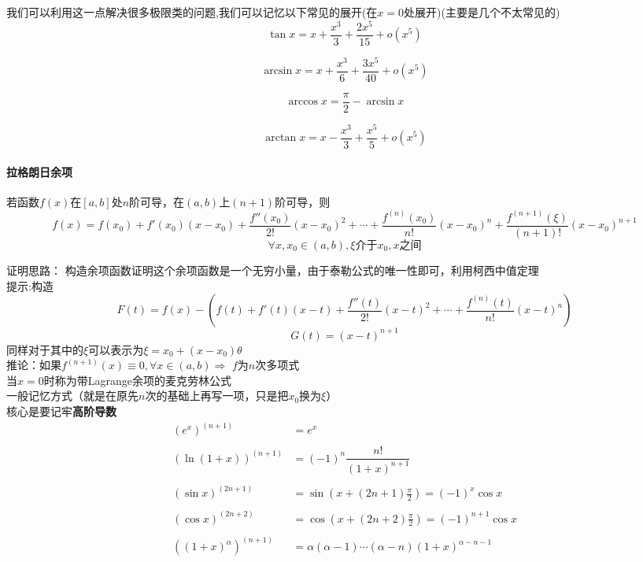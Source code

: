 \documentclass[11pt,hyperref,a4paper,UTF8]{ctexart}
\newcommand{\parameter}[1]{\left(#1\right)}
\begin{document}
\begin{CJK}{UTF8}{gkai}
我们可以利用这一点解决很多极限类的问题,我们可以记忆以下常见的展开(在$x = 0$处展开)(主要是几个不太常见的)
\[\tan  x = x + \dfrac{x^3}{3} + \dfrac{2x^5}{15} + o(x^5) \]

\[\arcsin x = x + \dfrac{x^3}{6} + \dfrac{3x^5}{40} + o(x^5)\]

\[\arccos x = \dfrac{\pi}{2} - \arcsin x\]

\[\arctan x = x - \dfrac{x^3}{3} + \dfrac{x^5}{5} + o(x^5)\]

\paragraph{拉格朗日余项}
若函数$f(x)$在$[a,b]$处$n$阶可导，在$(a,b)$上$(n+1)$阶可导，则
\[f(x) = f(x_0) + f'(x_0) (x-x_0) + \dfrac{f''(x_0)}{2 !} (x-x_0)^2 + \cdots + \dfrac{f^{(n)}(x_0)}{n !} (x-x_0)^n + \dfrac{f^{(n+1)}(\xi)}{(n+1) !} (x-x_0)^{n+1}\]
\[\forall x,x_0\in (a,b),\xi\text{介于}x_0,x\text{之间}\]

证明思路： 构造余项函数证明这个余项函数是一个无穷小量，由于泰勒公式的唯一性即可，利用柯西中值定理\\

提示:构造\[F(t) = f(x) - (f(t) + f'(t) (x-t) + \dfrac{f''(t)}{2 !} (x-t)^2 + \cdots + \dfrac{f^{(n)}(t)}{n !} (x-t)^n )\]\[G(t) = (x-t) ^ {n+1}\]
同样对于其中的$\xi$可以表示为$\xi = x_0 + (x- x_0) \theta$\\

推论：如果$f^{(n+1)}(x)\equiv 0,\forall x\in (a,b)\Rightarrow$ $f$为$n$次多项式\\


当$x=0$时称为带Lagrange余项的麦克劳林公式\\

一般记忆方式（就是在原先$n$次的基础上再写一项，只是把$x_0$换为$\xi$）\\
核心是要记牢\textbf{高阶导数}
\[
\begin{aligned}
    (e^x)^{(n + 1)} &= e^x\\
    &\\
    (\ln(1 + x))^{(n + 1)} &= (-1)^n \dfrac{n !}{(1 + x)^{n + 1}} \\
    &\\
    (\sin x)^{(2n + 1)} &= \sin \parameter{x + (2n + 1) \frac{\pi}{2}} = (-1)^{x} \cos x\\
    &\\
    (\cos x)^{(2n + 2)} &= \cos \parameter{x + (2n + 2) \frac{\pi}{2}} = (-1)^{n + 1} \cos x\\   
    &\\
    ((1 + x)^\alpha)^{(n + 1)} &= \alpha(\alpha - 1)\cdots (\alpha - n)(1 + x)^{\alpha - n - 1}\\
\end{aligned}   
\]


\end{CJK}
\end{document}
